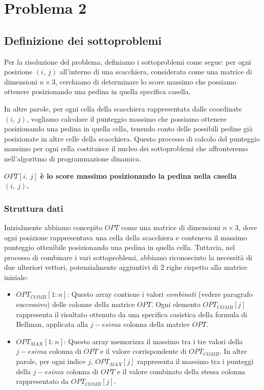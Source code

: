 \section{Problema 2}

\subsection{Definizione dei sottoproblemi}

Per la risoluzione del problema, definiamo i sottoproblemi come segue: per ogni posizione $(i,\ j)$ all'interno di una scacchiera, 
considerata come una matrice di dimensioni $n \times 3$, cerchiamo di determinare lo score massimo che possiamo ottenere posizionando 
una pedina in quella specifica casella.
\newline

In altre parole, per ogni cella della scacchiera rappresentata dalle coordinate $(i,\ j)$, vogliamo calcolare 
il punteggio massimo che possiamo ottenere posizionando una pedina in quella cella, tenendo conto delle possibili pedine 
già posizionate in altre celle della scacchiera. Questo processo di calcolo del punteggio massimo per ogni cella 
costituisce il nucleo dei sottoproblemi che affronteremo nell'algoritmo di programmazione dinamica.

\begin{center}
	$OPT[i,\ j]$ \bf{è lo score massimo posizionando la pedina nella casella} $(i,\ j)$.
\end{center}

\subsubsection*{Struttura dati}

Inizialmente abbiamo concepito $OPT$ come una matrice di dimensioni $n \times 3$, dove ogni posizione rappresentava una cella 
della scacchiera e conteneva il massimo punteggio ottenibile posizionando una pedina in quella cella. 
Tuttavia, nel processo di combinare i vari sottoproblemi, abbiamo riconosciuto la necessità di due ulteriori vettori, 
potenzialmente aggiuntivi di 2 righe rispetto alla matrice iniziale:

\begin{itemize}
	\item $OPT_{COMB}[1:n]$: Questo array contiene i valori \textit{combinati} (vedere paragrafo successivo) 
	      delle colonne della matrice $OPT$. Ogni elemento $OPT_{COMB}[j]$ rappresenta il
	      risultato ottenuto da una specifica casistica della formula di Bellman,
	      applicata alla $j-esima$ colonna della matrice $OPT$.
	\item $OPT_{MAX}[1:n]$: Questo array memorizza il massimo tra i tre valori della $j-esima$
	      colonna di $OPT$ e il valore corrispondente di $OPT_{COMB}$. In altre parole,
	      per ogni indice $j$, $OPT_{MAX}[j]$ rappresenta il massimo tra i punteggi della $j-esima$
	      colonna di $OPT$ e il valore combinato della stessa colonna rappresentato da $OPT_{COMB}[j]$.
\end{itemize}

